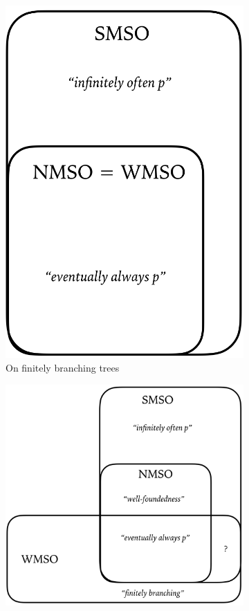 \begin{figure}[htb]
\centering
\begin{subfigure}[b]{0.17\textwidth}
   \includegraphics[width=\textwidth]{figures/fintree.png}
   \caption{On finitely branching trees}
   \label{fig:fintree}
\end{subfigure}
\begin{subfigure}[b]{0.3\textwidth}
    \includegraphics[width=\textwidth]{figures/tree.png}

\end{subfigure}
\end{figure}
